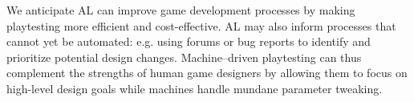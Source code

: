 \documentclass{sig-alternate}
\begin{document}
We anticipate AL can improve game development processes by making playtesting more efficient and cost-effective.
AL may also inform processes that cannot yet be automated: e.g. using forums or bug reports to identify and prioritize potential design changes.
Machine--driven playtesting can thus complement the strengths of human game designers by allowing them to focus on high-level design goals while machines handle mundane parameter tweaking.





\pagebreak


\end{document}
